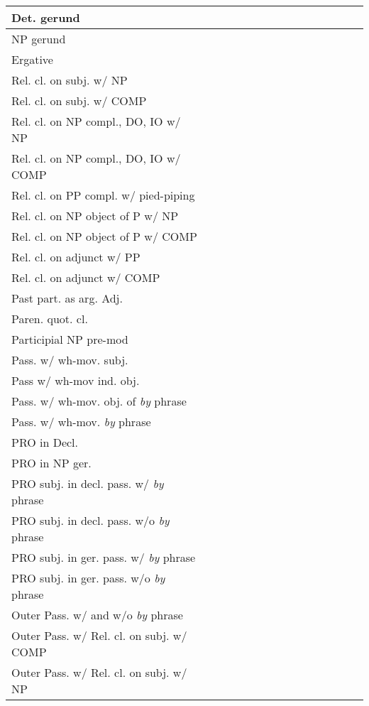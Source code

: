 \begin{center}
\begin{tabular}{|p{2.4in}||*{14}{c|}}
\hline
Det. gerund & & & & & & & & & & & & & & \\
\hline
NP gerund & & & & & & & & & & & & & & \\
\hline
Ergative & & & & & & & & & & & & & & \\
\hline
Rel. cl. on subj. w/ NP & & & & & & & & & & & & & & \\
\hline
Rel. cl. on subj. w/ COMP & & & & & & & & & & & & & & \\
\hline
Rel. cl. on NP compl., DO, IO w/ NP & & & & & & & & & & & & & & \\
\hline
Rel. cl. on NP compl., DO, IO w/ COMP & & & & & & & & & & & & & & \\
\hline
Rel. cl. on PP compl. w/ pied-piping & & & & & & & & & & & & & & \\
\hline
Rel. cl. on NP object of P w/ NP & & & & & & & & & & & & & & \\
\hline
Rel. cl. on NP object of P w/ COMP & & & & & & & & & & & & & & \\
\hline
Rel. cl. on adjunct w/ PP & & & & & & & & & & & & & & \\
\hline
Rel. cl. on adjunct w/ COMP & & & & & & & & & & & & & & \\
\hline
Past part. as arg. Adj. & & & & & & & & & & & & & & \\
\hline
Paren. quot. cl. & & & & & & & & & & & & & & \\
\hline
Participial NP pre-mod & & & & & & & & & & & & & & \\
\hline
Pass. w/ wh-mov. subj. & & & & & & & & & & & & & & \\
\hline
Pass w/ wh-mov ind. obj. & & & & & & & & & & & & & & \\
\hline
Pass. w/ wh-mov. obj. of  {\it by} phrase & & & & & & & & & & & & & & \\
\hline
Pass. w/ wh-mov. {\it by} phrase & & & & & & & & & & & & & & \\
\hline
PRO in Decl. & & & & & & & & & & & & & & \\
\hline
PRO in NP ger. & & & & & & & & & & & & & & \\
\hline
PRO subj. in decl. pass. w/ {\it by} phrase & & & & & & & & & & & & & & \\
\hline
PRO subj. in decl. pass. w/o {\it by} phrase & & & & & & & & & & & & & & \\
\hline
PRO subj. in ger. pass. w/ {\it by} phrase & & & & & & & & & & & & & & \\
\hline
PRO subj. in ger. pass. w/o {\it by} phrase & & & & & & & & & & & & & & \\
\hline
Outer Pass. w/ and w/o {\it by} phrase & & & & & & & & & & & & & & \\
\hline
Outer Pass. w/ Rel. cl. on subj. w/ COMP & & & & & & & & & & & & & & \\
\hline
Outer Pass. w/ Rel. cl. on subj. w/ NP & & & & & & & & & & & & & & \\
\hline
\end{tabular}
\end{center}

